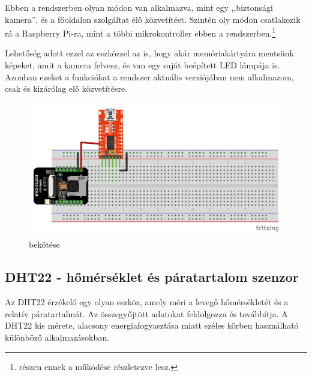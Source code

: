 \documentclass[
]{thesis-ekf}
\theoremstyle{definition}
\theoremstyle{remark}
\begin{document}
	Ebben a rendszerben olyan módon van alkalmazva, mint egy ,,biztonsági kamera'', és a főoldalon szolgáltat élő közvetítést. Szintén oly módon csatlakozik rá a Raspberry Pi-ra, mint a többi mikrokontroller ebben a rendszerben.\footnote{\label{later-expl-fn} részen ennek a működése részletezve lesz.}
	
	Lehetőség adott ezzel az eszközzel az is, hogy akár memóriakártyára mentsünk képeket, amit a kamera felvesz, és van egy saját beépített LED lámpája is. Azonban ezeket a funkciókat a rendszer aktuális verziójában nem alkalmazom, csak és kizárólag elő közvetítésre.
	
	\begin{figure}[ht!]
		\centering
		\includegraphics[width=16cm]{./img/ESP32 CAM schematics}
		\caption{ bekötése}
		\label{esp32-cam-schematics}
	\end{figure}	
	
	\subsection{DHT22 - hőmérséklet és páratartalom szenzor}
	
	Az DHT22 érzékelő egy olyan eszköz, amely méri a levegő hőmérsékletét és a relatív  páratartalmát. Az összegyűjtött adatokat feldolgozza és továbbítja. A DHT22 kis mérete, alacsony energiafogyasztása miatt széles körben használható különböző alkalmazásokban.\cite{dht22}
	
\end{document}
